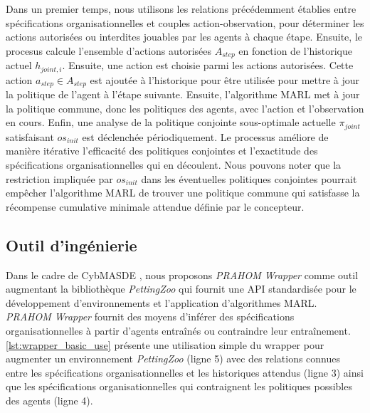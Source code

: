 Dans un premier temps, nous utilisons les relations précédemment établies entre spécifications organisationnelles et couples action-observation, pour déterminer les actions autorisées ou interdites jouables par les agents à chaque étape.
Ensuite, le procesus calcule l'ensemble d'actions autorisées $A_{step}$ en fonction de l'historique actuel $h_{joint,i}$. Ensuite, une action est choisie parmi les actions autorisées. Cette action $a_{step} \in A_{step}$ est ajoutée à l'historique pour être utilisée pour mettre à jour la politique de l'agent à l'étape suivante. Ensuite, l'algorithme MARL met à jour la politique commune, donc les politiques des agents, avec l'action et l'observation en cours.
Enfin, une analyse de la politique conjointe sous-optimale actuelle $\pi_{joint}$ satisfaisant $os_{init}$ est déclenchée périodiquement. Le processus améliore de manière itérative l'efficacité des politiques conjointes et l'exactitude des spécifications organisationnelles qui en découlent.
Nous pouvons noter que la restriction impliquée par $os_{init}$ dans les éventuelles politiques conjointes pourrait empêcher l'algorithme MARL de trouver une politique commune qui satisfasse la récompense cumulative minimale attendue définie par le concepteur.

\subsection{Outil d'ingénierie}

Dans le cadre de CybMASDE\footnotemark[1]
%
%
, nous proposons \emph{PRAHOM Wrapper}\label{PettingZoo-wrapper} comme outil augmentant la bibliothèque \emph{PettingZoo} qui fournit une API standardisée pour le développement d'environnements et l'application d'algorithmes MARL.
%
\emph{PRAHOM Wrapper} fournit des moyens d'inférer des spécifications organisationnelles à partir d'agents entraînés ou contraindre leur entraînement.
%
\autoref{lst:wrapper_basic_use} présente une utilisation simple du wrapper pour augmenter un environnement \emph{PettingZoo} (ligne 5) avec des relations connues entre les spécifications organisationnelles et les historiques attendus (ligne 3) ainsi que les spécifications organisationnelles qui contraignent les politiques possibles des agents (ligne 4).

